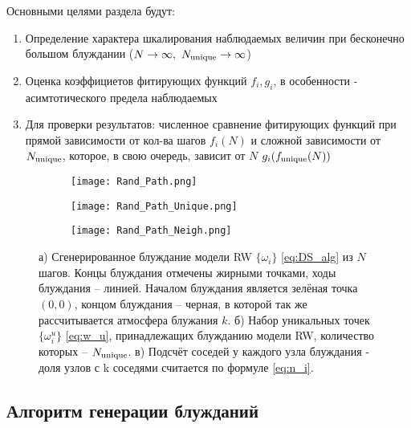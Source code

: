 Основными целями раздела будут:

\begin{enumerate}
\item Определение характера шкалирования наблюдаемых величин при бесконечно большом блуждании ($N \to \infty,\ \Nun \to \infty$)
\item Оценка коэффициетов фитирующих функций $f_i, g_i$, в особенности - асимтотического предела наблюдаемых
\item Для проверки результатов: численное сравнение фитирующих функций при прямой зависимости от кол-ва шагов $f_i(N)$ и сложной зависимости от $N_{\textup{unique}}$, которое, в свою очередь, зависит от $N$ $g_i(f_{\textup{unique}}(N))$
\end{enumerate}



\begin{figure}[h]
    
\begin{subfigure}{0.5\textwidth}
    \texttt{[image: Rand\_Path.png]}
    \caption{}
    \label{fig:path_1}
\end{subfigure}
\hfill
\begin{subfigure}{0.5\textwidth}
    \texttt{[image: Rand\_Path\_Unique.png]}
    \caption{}
    \label{fig:path_2}
\end{subfigure}
\vfill
\centering
\begin{subfigure}{0.5\textwidth}
\texttt{[image: Rand\_Path\_Neigh.png]}
\caption{}
\label{fig:path_3}
\end{subfigure}
\caption{а) Сгенерированное блуждание модели RW $\{\omega_i\}$ \eqref{eq:DS_alg} из $N$ шагов. Концы блуждания отмечены жирными точками, ходы блуждания -- линией. Началом блуждания является зелёная точка $(0,0)$, концом блуждания -- черная, в которой так же рассчитывается атмосфера блужания $k$. б) Набор уникальных точек $\{\omega^u_i\}$ \eqref{eq:w_u}, принадлежащих блужданию модели RW, количество которых -- $N_{\textup{unique}}$. в) Подсчёт соседей у каждого узла блуждания - доля узлов с k соседями считается по формуле \eqref{eq:n_i}.}
\label{fig:path_alg}
\end{figure}

\subsection{Алгоритм генерации блужданий}

